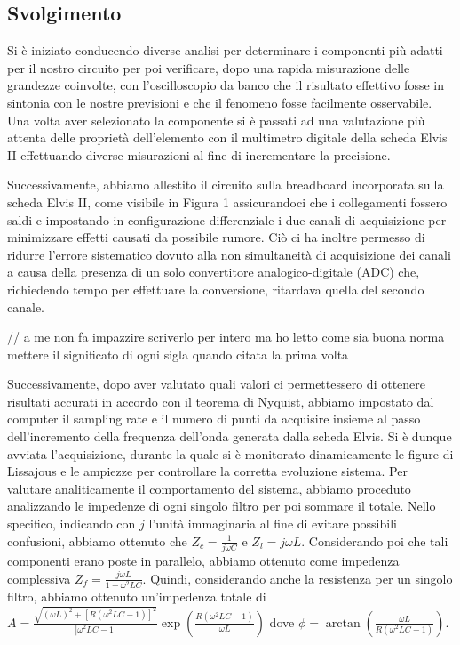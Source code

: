 \documentclass[12pt, letterpaper]{article}
\begin{document}
 
\subsection{Svolgimento}
Si è iniziato conducendo diverse analisi per determinare i componenti più adatti per il nostro circuito per poi verificare, dopo una rapida misurazione delle grandezze coinvolte, con l’oscilloscopio da banco che il risultato effettivo fosse in sintonia con le nostre previsioni e che il fenomeno fosse facilmente osservabile. Una volta aver selezionato la componente si è passati ad una valutazione più attenta delle proprietà dell’elemento con il multimetro digitale della scheda Elvis II effettuando diverse misurazioni al fine di incrementare la precisione. 

Successivamente, abbiamo allestito il circuito sulla breadboard incorporata sulla scheda Elvis II, come visibile in Figura 1 assicurandoci che i collegamenti fossero saldi e impostando in configurazione differenziale i due canali di acquisizione per minimizzare effetti causati da possibile rumore. Ciò ci ha inoltre permesso di ridurre l'errore sistematico dovuto alla non simultaneità di acquisizione dei canali a causa della presenza di un solo convertitore analogico-digitale (ADC) che, richiedendo tempo per effettuare la conversione, ritardava quella del secondo canale.

 // a me non fa impazzire scriverlo per intero ma ho letto come sia buona norma mettere il significato di ogni sigla quando citata la prima volta

Successivamente, dopo aver valutato quali valori ci permettessero di ottenere risultati accurati in accordo con il teorema di Nyquist, abbiamo impostato dal computer il sampling rate e il numero di punti da acquisire insieme al passo dell’incremento della frequenza dell'onda generata dalla scheda Elvis. Si è dunque avviata l'acquisizione, durante la quale si è monitorato dinamicamente le figure di Lissajous e le ampiezze per controllare la corretta evoluzione sistema.
Per valutare analiticamente il comportamento del sistema, abbiamo proceduto analizzando le impedenze di ogni singolo filtro per poi sommare il totale. Nello specifico, indicando con $j$ l'unità immaginaria al fine di evitare possibili confusioni, abbiamo ottenuto che $Z_c = \frac{1}{j \omega C}$ e $Z_l = j \omega L$. Considerando poi che tali componenti erano poste in parallelo, abbiamo ottenuto come impedenza complessiva $Z_f= \frac{j\omega L}{1 - \omega^2 LC}$. Quindi, considerando anche la resistenza per un singolo filtro, abbiamo ottenuto un'impedenza totale di
$A= \frac{\sqrt{(\omega L)^2 + [R(\omega^2 LC -1)]^2}}{|\omega^2 LC -1|} \exp\left(\frac{R(\omega^2 LC -1)}{\omega L}\right) $
dove $\phi = \arctan\left(\frac{\omega L}{R(\omega^2 LC -1)}\right)$.
\end{document}
